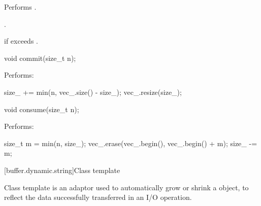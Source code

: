 \begin{itemdescr}
\pnum
\effects Performs .

\pnum
\returns {}.

\pnum
\changed{\remarks}{\throws}  if  exceeds .
\end{itemdescr}

%
\begin{itemdecl}
void commit(size_t n);
\end{itemdecl}

\begin{itemdescr}
\pnum
\effects Performs:
\begin{codeblock}
size_ += min(n, vec_.size() - size_);
vec_.resize(size_);
\end{codeblock}

\end{itemdescr}

%
\begin{itemdecl}
void consume(size_t n);
\end{itemdecl}

\begin{itemdescr}
\pnum
\effects Performs:
\begin{codeblock}
size_t m = min(n, size_);
vec_.erase(vec_.begin(), vec_.begin() + m);
size_ -= m;
\end{codeblock}

\end{itemdescr}



[buffer.dynamic.string]{Class template }

%
\pnum
Class template  is an adaptor used to automatically grow or shrink a  object, to reflect the data successfully transferred in an I/O operation.

